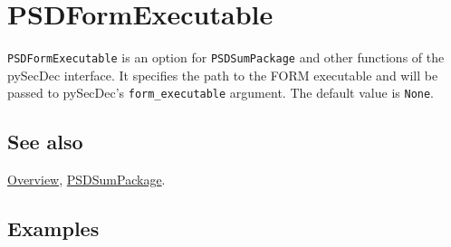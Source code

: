 \documentclass[../FeynHelpersManual.tex]{subfiles}
\begin{document}
\hypertarget{psdformexecutable}{
\section{PSDFormExecutable}\label{psdformexecutable}}

\texttt{PSDFormExecutable} is an option for \texttt{PSDSumPackage} and
other functions of the pySecDec interface. It specifies the path to the
FORM executable and will be passed to pySecDec's
\texttt{form_executable} argument. The default value is \texttt{None}.

\subsection{See also}

\hyperlink{toc}{Overview}, \hyperlink{psdsumpackage}{PSDSumPackage}.

\subsection{Examples}
\end{document}
